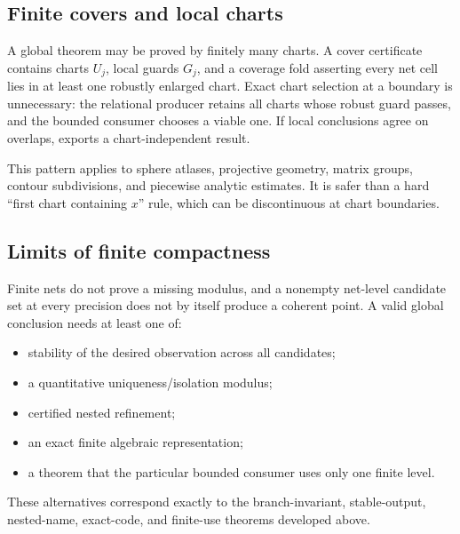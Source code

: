 \subsection{Finite covers and local charts}

A global theorem may be proved by finitely many charts.  A cover certificate contains charts $U_j$, local guards $G_j$, and a coverage fold asserting every net cell lies in at least one robustly enlarged chart.  Exact chart selection at a boundary is unnecessary: the relational producer retains all charts whose robust guard passes, and the bounded consumer chooses a viable one.  If local conclusions agree on overlaps,  exports a chart-independent result.

This pattern applies to sphere atlases, projective geometry, matrix groups, contour subdivisions, and piecewise analytic estimates.  It is safer than a hard ``first chart containing $x$'' rule, which can be discontinuous at chart boundaries.

\subsection{Limits of finite compactness}

Finite nets do not prove a missing modulus, and a nonempty net-level candidate set at every precision does not by itself produce a coherent point.  A valid global conclusion needs at least one of:
\begin{itemize}
\item stability of the desired observation across all candidates;
\item a quantitative uniqueness/isolation modulus;
\item certified nested refinement;
\item an exact finite algebraic representation;
\item a theorem that the particular bounded consumer uses only one finite level.
\end{itemize}
These alternatives correspond exactly to the branch-invariant, stable-output, nested-name, exact-code, and finite-use theorems developed above.
